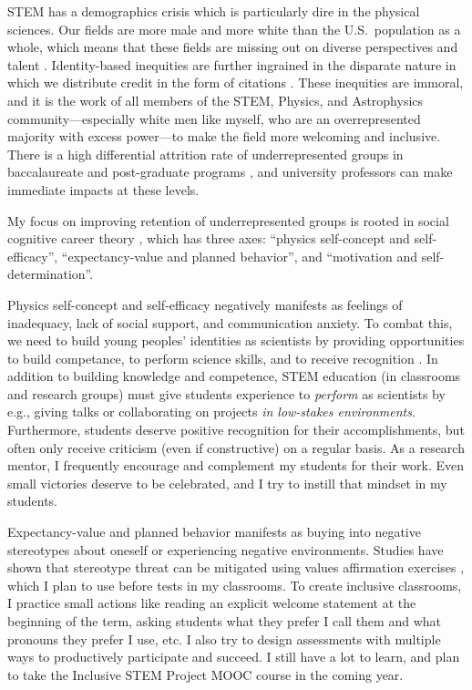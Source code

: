 \documentclass[11pt]{article}
\begin{document}
\thispagestyle{fancy}

\vspace{-0.2cm}
STEM has a demographics crisis which is particularly dire in the physical sciences. 
Our fields are more male and more white than the U.S.~population as a whole, which means that these fields are missing out on diverse perspectives and talent \citep{stem_laborforce_2021}. 
Identity-based inequities are further ingrained in the disparate nature in which we distribute credit in the form of citations \citep{teich_etal_2022}.
These inequities are immoral, and it is the work of all members of the STEM, Physics, and Astrophysics community---especially white men like myself, who are an overrepresented majority with excess power---to make the field more welcoming and inclusive.
There is a high differential attrition rate of underrepresented groups in baccalaureate and post-graduate programs \citep{whitcomb_singh_2021}, and university professors can make immediate impacts at these levels.

My focus on improving retention of underrepresented groups is rooted in social cognitive career theory \citep{kelly_2016}, which has three axes: ``physics self-concept and self-efficacy'', ``expectancy-value and planned behavior'', and ``motivation and self-determination''.

Physics self-concept and self-efficacy negatively manifests as feelings of inadequacy, lack of social support, and communication anxiety.
To combat this, we need to build young peoples' identities as scientists by providing opportunities to build competance, to perform science skills, and to receive recognition  \citep{hazari_etal_2010}.
In addition to building knowledge and competence, STEM education (in classrooms and research groups) must give students experience to \emph{perform} as scientists by e.g., giving talks or collaborating on projects \emph{in low-stakes environments}.
Furthermore, students deserve positive recognition for their accomplishments, but often only receive criticism (even if constructive) on a regular basis.
As a research mentor, I frequently encourage and complement my students for their work. 
Even small victories deserve to be celebrated, and I try to instill that mindset in my students.

Expectancy-value and planned behavior manifests as buying into negative stereotypes about oneself or experiencing negative environments.
Studies have shown that stereotype threat can be mitigated using values affirmation exercises \citep{miyake_etal_2010}, which I plan to use before tests in my classrooms.
To create inclusive classrooms, I practice small actions like reading an explicit welcome statement at the beginning of the term, asking students what they prefer I call them and what pronouns they prefer I use, etc.
I also try to design assessments with multiple ways to productively participate and succeed.
I still have a lot to learn, and plan to take the Inclusive STEM Project MOOC course in the coming year.
\end{document}

